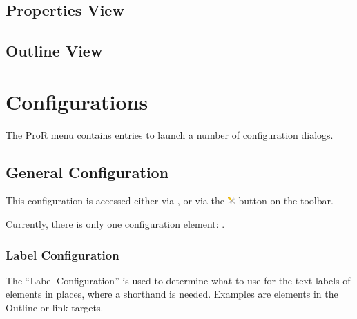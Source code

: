\subsection{Properties View}

\subsection{Outline View}

\section{Configurations}


The ProR menu contains entries to launch a number of configuration
dialogs.

\subsection{General Configuration}
\label{sec:general_configuration}

This configuration is accessed either via , or
via the \includegraphics[height=0.8em]{../rmf-images/ReqIFUIToolExtension.png} button on the toolbar.

Currently, there is only one configuration element: .

\subsubsection{Label Configuration}

The ``Label Configuration'' is used to determine what to use for the text labels of elements
in places, where a shorthand is needed.  Examples are elements in the Outline or link targets.

